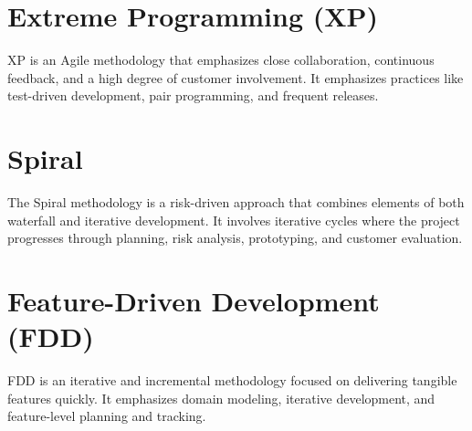 \section{Extreme Programming (XP)}

XP is an Agile methodology that emphasizes close collaboration, continuous feedback, and a high degree of customer involvement. It emphasizes practices like test-driven development, pair programming, and frequent releases.

\section{Spiral}

The Spiral methodology is a risk-driven approach that combines elements of both waterfall and iterative development. It involves iterative cycles where the project progresses through planning, risk analysis, prototyping, and customer evaluation.

\section{Feature-Driven Development (FDD)}

FDD is an iterative and incremental methodology focused on delivering tangible features quickly. It emphasizes domain modeling, iterative development, and feature-level planning and tracking.
